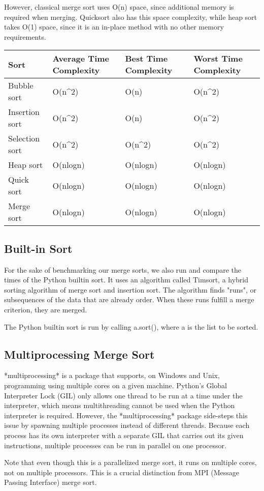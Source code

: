 However, classical merge sort uses O(n) space, since additional memory is required when merging. Quicksort also has this
space complexity, while heap sort takes O(1) space, since it is an in-place method with no other memory requirements.
\begin{longtable}[]{@{}llll@{}}
    \toprule
    Sort & Average Time Complexity & Best Time Complexity & Worst Time
    Complexity\tabularnewline
    \midrule
    \endhead
    Bubble sort & O(n\^{}2) & O(n) & O(n\^{}2)\tabularnewline
    Insertion sort & O(n\^{}2) & O(n) & O(n\^{}2)\tabularnewline
    Selection sort & O(n\^{}2) & O(n\^{}2) & O(n\^{}2)\tabularnewline
    Heap sort & O(nlogn) & O(nlogn) & O(nlogn)\tabularnewline
    Quick sort & O(nlogn) & O(nlogn) & O(nlogn)\tabularnewline
    Merge sort & O(nlogn) & O(nlogn) & O(nlogn)\tabularnewline
    \bottomrule
    \end{longtable}

\subsection{Built-in Sort}

For the sake of benchmarking our merge sorts, we also run and compare the times of the Python builtin sort.  
It uses an algorithm called Timsort, a hybrid sorting algorithm of merge sort and insertion sort. The algorithm 
finds "runs", or subsequences of the data that are already order. When these runs fulfill a merge criterion, 
they are merged. 

The Python builtin sort is run by calling a.sort(), where a is the list to be sorted. 

\subsection{Multiprocessing Merge Sort}

*multiprocessing* is a package that supports, on Windows and Unix, programming using multiple cores on a given
machine. Python's Global Interpreter Lock (GIL) only allows one thread to be run at a time under the interpreter, which
means multithreading cannot be used when the Python interpreter is required. However, the *multiprocessing* package
side-steps this issue by spawning multiple processes instead of different threads. Because each process has its own interpreter with a
separate GIL that carries out its given instructions, multiple processes can be run in parallel on one processor.  

Note that even though this is a parallelized merge sort, it runs on multiple cores, not on multiple processors. 
This is a crucial distinction from MPI (Message Passing Interface) merge sort. 

